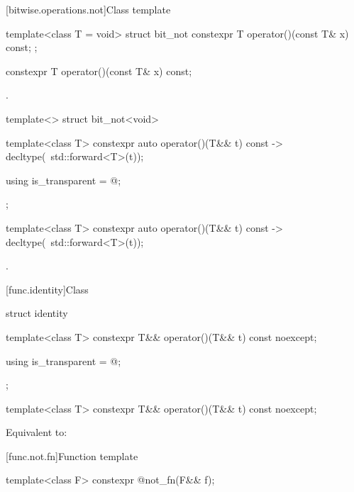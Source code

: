 [bitwise.operations.not]{Class template }

\begin{itemdecl}
template<class T = void> struct bit_not {
  constexpr T operator()(const T& x) const;
};
\end{itemdecl}

%
\begin{itemdecl}
constexpr T operator()(const T& x) const;
\end{itemdecl}

\begin{itemdescr}
\pnum
\returns
{}.
\end{itemdescr}

%
\begin{itemdecl}
template<> struct bit_not<void> {
  template<class T> constexpr auto operator()(T&& t) const
    -> decltype(~std::forward<T>(t));

  using is_transparent = @\unspec@;
};
\end{itemdecl}

%
\begin{itemdecl}
template<class T> constexpr auto operator()(T&& t) const
  -> decltype(~std::forward<T>(t));
\end{itemdecl}

\begin{itemdescr}
\pnum
\returns
{}.
\end{itemdescr}


[func.identity]{Class }

%
\begin{itemdecl}
struct identity {
  template<class T>
    constexpr T&& operator()(T&& t) const noexcept;

  using is_transparent = @\unspec@;
};

template<class T>
  constexpr T&& operator()(T&& t) const noexcept;
\end{itemdecl}

\begin{itemdescr}
\pnum
\effects
Equivalent to: 
\end{itemdescr}


[func.not.fn]{Function template }

%
\begin{itemdecl}
template<class F> constexpr @\unspec@ not_fn(F&& f);
\end{itemdecl}

